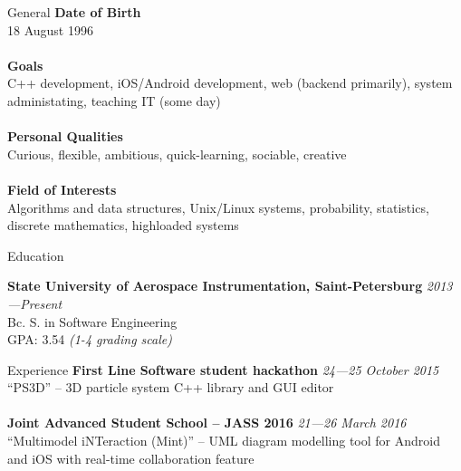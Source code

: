 \documentclass{resume} %
\begin{document}
\begin{rSection}{General}
{\bf Date of Birth} \\
18 August 1996 \\ \\
{\bf Goals} \\
C++ development, iOS\slash Android development, web (backend primarily), system administating, teaching IT (some day) \\ \\
{\bf Personal Qualities} \\
Curious, flexible, ambitious, quick-learning, sociable, creative \\ \\
{\bf Field of Interests} \\
Algorithms and data structures, Unix/Linux systems, probability, statistics, \\ 
discrete mathematics, highloaded systems
\end{rSection}


\begin{rSection}{Education}

{\bf State University of Aerospace Instrumentation, Saint-Petersburg} \hfill {\em 2013---Present} \\ 
Bc. S. in Software Engineering \\
GPA: 3.54 {\it (1-4 grading scale)} \\

\end{rSection}


\begin{rSection}{Experience}
{\bf First Line Software student hackathon} \hfill {\em 24---25 October 2015} \\
``PS3D'' -- 3D particle system C++ library and GUI editor \\ \\
{\bf Joint Advanced Student School -- JASS 2016} \hfill {\em 21---26 March 2016} \\
``Multimodel iNTeraction (Mint)'' -- UML diagram modelling tool for Android and iOS with real-time 
collaboration feature \\ 

\end{rSection}
\end{document}
